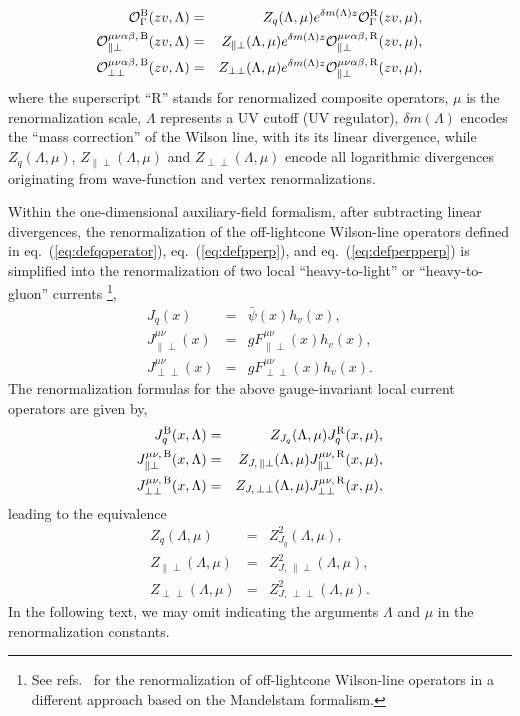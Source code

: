 \begin{eqnarray}
\mathcal{O}^{\rm B}_{\Gamma}(zv, \Lambda) &=& Z_{q}(\Lambda,\mu) e^{\delta m(\Lambda)z} \mathcal{O}^{\rm R}_{\Gamma}(zv, \mu),\\
\mathcal{O}^{\mu\nu\alpha\beta,\, \rm B}_{\|\perp}(zv, \Lambda) &=& Z_{\|\perp}(\Lambda,\mu) e^{\delta m(\Lambda)z} \mathcal{O}_{\|\perp}^{\mu\nu\alpha\beta,\, \rm R}(zv, \mu),\\
\mathcal{O}^{\mu\nu\alpha\beta,\, \rm B}_{\perp\perp}(zv, \Lambda) &=& Z_{\perp\perp}(\Lambda,\mu) e^{\delta m(\Lambda)z} \mathcal{O}_{\|\perp}^{\mu\nu\alpha\beta,\, \rm R}(zv, \mu),
\end{eqnarray}
where the superscript ``R” stands for renormalized composite operators, $\mu$ is the renormalization scale, $\Lambda$ represents a UV cutoff (UV regulator), $\delta m(\Lambda)$ encodes the ``mass correction” of the Wilson line, with its  its  linear divergence, while $Z_{q}(\Lambda,\mu)$, $Z_{\|\perp}(\Lambda,\mu)$ and $Z_{\perp\perp}(\Lambda,\mu)$ encode all logarithmic divergences originating from wave-function and vertex renormalizations.


Within the one-dimensional auxiliary-field formalism, after subtracting linear divergences, the renormalization of the off-lightcone Wilson-line operators defined in eq.~(\ref{eq:defqoperator}), eq.~(\ref{eq:defpperp}), and eq.~(\ref{eq:defperpperp}) is simplified into the renormalization of two local ``heavy-to-light” or ``heavy-to-gluon” currents \footnote{See refs.~\cite{Stefanis:1983ke,Stefanis:2012if} for the renormalization of off-lightcone Wilson-line operators in a different approach based on the Mandelstam formalism.},
\begin{eqnarray}
\label{eq:currentoperator}
J_q(x) &=& \bar{\psi}(x) h_v(x),\\
J^{\mu\nu}_{\|\perp}(x) &=& gF_{\|\perp}^{\mu\nu}(x)h_v(x),\\
J^{\mu\nu}_{\perp\perp}(x) &=& gF_{\perp\perp}^{\mu\nu}(x)h_v(x).
\end{eqnarray}
The renormalization formulas for the above  gauge-invariant local current operators are given by,
\begin{eqnarray}
J_q^{\rm B} (x, \Lambda) &=& Z_{J_q} (\Lambda,\mu)J_q^{\rm R}(x, \mu),\\
J^{\mu\nu,\, \rm B}_{\|\perp}(x, \Lambda) &=& Z_{J,\, \|\perp}(\Lambda,\mu)J^{\mu\nu,\, \rm R}_{\|\perp}(x, \mu),\\
J^{\mu\nu,\, \rm B}_{\perp\perp}(x, \Lambda) &=& Z_{J,\, \perp\perp}(\Lambda,\mu)J^{\mu\nu,\, \rm R}_{\perp\perp}(x, \mu),
\end{eqnarray}
leading to the equivalence 
\begin{eqnarray}
Z_{q} (\Lambda,\mu)&=& Z_{J_q}^2(\Lambda,\mu),\\
Z_{\|\perp} (\Lambda,\mu)&=& Z^2_{J,\, \|\perp}(\Lambda,\mu),\\
Z_{\perp\perp} (\Lambda,\mu)&=& Z^2_{J,\, \perp\perp}(\Lambda,\mu).
\end{eqnarray}
In the following text, we may omit indicating the arguments $\Lambda$ and $\mu$ in the renormalization constants.

